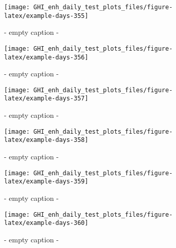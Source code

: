 \documentclass[
  10pt,
  a4paper,oneside]{article}
\begin{document}
\begin{figure}[H]

{\centering \texttt{[image: GHI\_enh\_daily\_test\_plots\_files/figure-latex/example-days-355]} 

}

\caption{ - empty caption - }\label{fig:example-days-355}
\end{figure}

\begin{figure}[H]

{\centering \texttt{[image: GHI\_enh\_daily\_test\_plots\_files/figure-latex/example-days-356]} 

}

\caption{ - empty caption - }\label{fig:example-days-356}
\end{figure}

\begin{figure}[H]

{\centering \texttt{[image: GHI\_enh\_daily\_test\_plots\_files/figure-latex/example-days-357]} 

}

\caption{ - empty caption - }\label{fig:example-days-357}
\end{figure}

\begin{figure}[H]

{\centering \texttt{[image: GHI\_enh\_daily\_test\_plots\_files/figure-latex/example-days-358]} 

}

\caption{ - empty caption - }\label{fig:example-days-358}
\end{figure}

\begin{figure}[H]

{\centering \texttt{[image: GHI\_enh\_daily\_test\_plots\_files/figure-latex/example-days-359]} 

}

\caption{ - empty caption - }\label{fig:example-days-359}
\end{figure}

\begin{figure}[H]

{\centering \texttt{[image: GHI\_enh\_daily\_test\_plots\_files/figure-latex/example-days-360]} 

}

\caption{ - empty caption - }\label{fig:example-days-360}
\end{figure}
\end{document}
